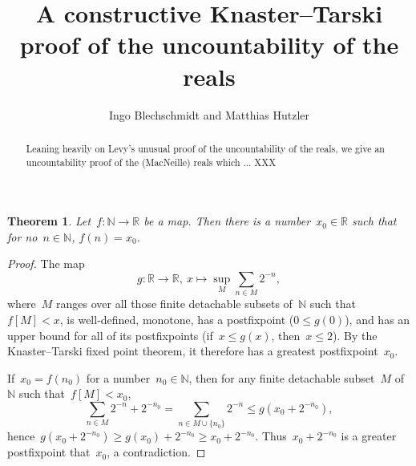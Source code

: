 \documentclass[oneside]{amsart}
\title{A constructive Knaster--Tarski proof of the uncountability of the reals}
\author{Ingo Blechschmidt and Matthias Hutzler}
\newcommand{\NN}{\mathbb{N}}
\newcommand{\RR}{\mathbb{R}}
\theoremstyle{definition}
\theoremstyle{plain}
\newtheorem{thm}[defn]{Theorem}
\theoremstyle{remark}
\begin{document}
\begin{abstract}
  Leaning heavily on Levy's unusual proof of the uncountability of the reals,
  we give an uncountability proof of the (MacNeille) reals which ... XXX
\end{abstract}

\maketitle
\thispagestyle{empty}

\begin{thm}Let~$f : \NN \to \RR$ be a map. Then there is a number~$x_0 \in \RR$
such that for no~$n \in \NN$, $f(n) = x_0$.\end{thm}

\begin{proof}The map
\[ g : \RR \longrightarrow \RR,\
  x \longmapsto \sup_M \sum_{n \in M} 2^{-n}, \]
where~$M$ ranges over all those finite detachable subsets of~$\NN$ such
that~$f[M] < x$, is well-defined, monotone, has a postfixpoint ($0 \leq g(0)$),
and has an upper bound for all of its postfixpoints (if~$x \leq g(x)$, then~$x
\leq 2$). By the Knaster--Tarski fixed point theorem, it therefore has a
greatest postfixpoint~$x_0$.

If~$x_0 = f(n_0)$ for a number~$n_0 \in \NN$, then for any finite detachable
subset~$M$ of~$\NN$ such that~$f[M] < x_0$,
\[ \sum_{n \in M} 2^{-n} + 2^{-n_0} = \sum_{n \in M \cup \{n_0\}} 2^{-n}
  \leq g(x_0 + 2^{-n_0}), \]
hence~$g(x_0 + 2^{-n_0}) \geq g(x_0) + 2^{-n_0} \geq x_0 + 2^{-n_0}$.
Thus~$x_0 + 2^{-n_0}$ is a greater postfixpoint that~$x_0$, a contradiction.
\end{proof}
\end{document}
